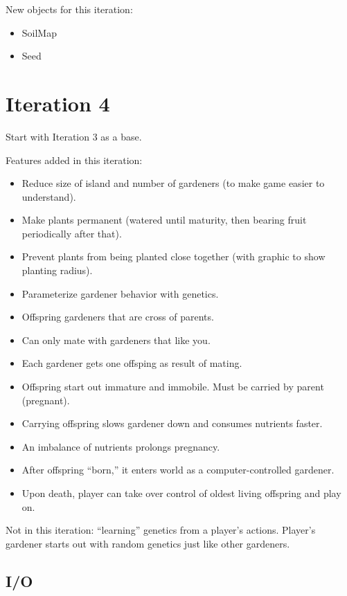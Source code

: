 \documentclass[12pt]{article}
\begin{document}
New objects for this iteration:
\begin{itemize}
\item SoilMap
\item Seed
\end{itemize}






\section{Iteration 4}

Start with Iteration 3 as a base.

Features added in this iteration:
\begin{itemize}
\item Reduce size of island and number of gardeners (to make game easier to understand).
\item Make plants permanent (watered until maturity, then bearing fruit periodically after that).
\item Prevent plants from being planted close together (with graphic to show planting radius).
\item Parameterize gardener behavior with genetics.
\item Offspring gardeners that are cross of parents.
\item Can only mate with gardeners that like you.
\item Each gardener gets one offsping as result of mating.
\item Offspring start out immature and immobile.  Must be carried by parent (pregnant).
\item Carrying offspring slows gardener down and consumes nutrients faster.
\item An imbalance of nutrients prolongs pregnancy.
\item After offspring ``born,'' it enters world as a computer-controlled gardener.
\item Upon death, player can take over control of oldest living offspring and play on. 
\end{itemize}

Not in this iteration:  ``learning'' genetics from a player's actions.  Player's gardener starts out with random genetics just like other gardeners.

\subsection{I/O}
\end{document}
